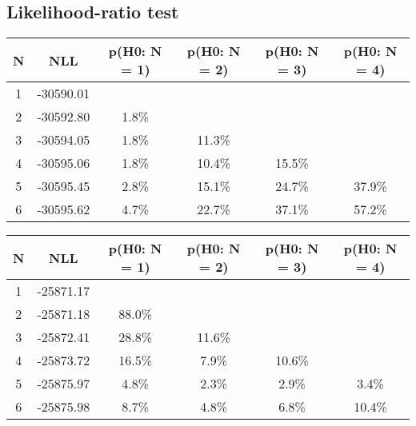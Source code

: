 \subsection{Likelihood-ratio test}
\begin{table}[htb]
	\begin{center}
{\footnotesize\renewcommand{\arraystretch}{1.4}
		\begin{tabular}{cc||cccc}
			N & NLL & p(H0: N = 1) & p(H0: N = 2) & p(H0: N = 3) & p(H0: N = 4)\\ 
		\hline
1 & -30590.01 & & & & \\
2 & -30592.80 & 1.8\% & & & \\
3 & -30594.05 & 1.8\% & 11.3\% & & \\
4 & -30595.06 & 1.8\% & 10.4\% & 15.5\% & \\
5 & -30595.45 & 2.8\% & 15.1\% & 24.7\% & 37.9\% \\
6 & -30595.62 & 4.7\% & 22.7\% & 37.1\% & 57.2\% \\
	\end{tabular}
		\label{tab:lab}
	}
	\end{center}\end{table}

\begin{table}[htb]
	\begin{center}
{\footnotesize\renewcommand{\arraystretch}{1.4}
		\begin{tabular}{cc||cccc}
			N & NLL & p(H0: N = 1) & p(H0: N = 2) & p(H0: N = 3) & p(H0: N = 4)\\ 
		\hline
1 & -25871.17 & & & & \\
2 & -25871.18 & 88.0\% & & & \\
3 & -25872.41 & 28.8\% & 11.6\% & & \\
4 & -25873.72 & 16.5\% & 7.9\% & 10.6\% & \\
5 & -25875.97 & 4.8\% & 2.3\% & 2.9\% & 3.4\% \\
6 & -25875.98 & 8.7\% & 4.8\% & 6.8\% & 10.4\% \\
	\end{tabular}
		\label{tab:lab}
	}
	\end{center}\end{table}

